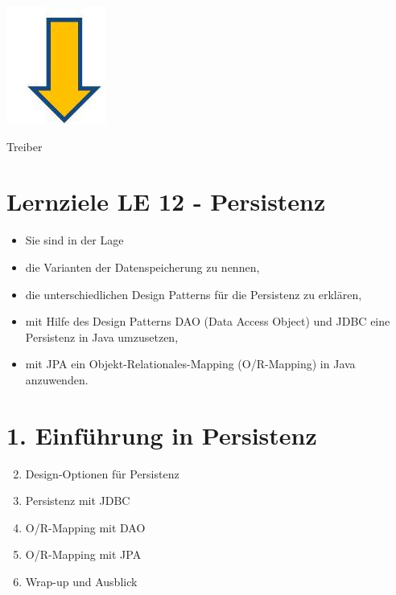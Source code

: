 \documentclass[10pt]{article}
\begin{document}
\begin{center}
\includegraphics[max width=\textwidth]{2025_01_02_5ba1dc702e9f94ba8e06g-02}
\end{center}

Treiber

\section*{Lernziele LE 12 - Persistenz}
\begin{itemize}
  \item Sie sind in der Lage
  \item die Varianten der Datenspeicherung zu nennen,
  \item die unterschiedlichen Design Patterns für die Persistenz zu erklären,
  \item mit Hilfe des Design Patterns DAO (Data Access Object) und JDBC eine Persistenz in Java umzusetzen,
  \item mit JPA ein Objekt-Relationales-Mapping (O/R-Mapping) in Java anzuwenden.
\end{itemize}

\section*{1. Einführung in Persistenz}
\begin{enumerate}
  \setcounter{enumi}{1}
  \item Design-Optionen für Persistenz
  \item Persistenz mit JDBC
  \item O/R-Mapping mit DAO
  \item O/R-Mapping mit JPA
  \item Wrap-up und Ausblick
\end{enumerate}
\end{document}
